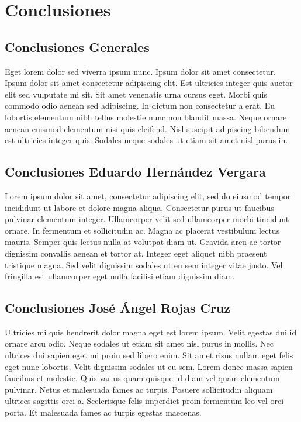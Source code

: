 \section{Conclusiones}
	\subsection{Conclusiones Generales}
	Eget lorem dolor sed viverra ipsum nunc. Ipsum dolor sit amet consectetur. Ipsum dolor sit amet consectetur adipiscing elit. Est ultricies integer quis auctor elit sed vulputate mi sit. Sit amet venenatis urna cursus eget. Morbi quis commodo odio aenean sed adipiscing. In dictum non consectetur a erat. Eu lobortis elementum nibh tellus molestie nunc non blandit massa. Neque ornare aenean euismod elementum nisi quis eleifend. Nisl suscipit adipiscing bibendum est ultricies integer quis. Sodales neque sodales ut etiam sit amet nisl purus in.
	\subsection{Conclusiones Eduardo Hern\'andez Vergara}
		Lorem ipsum dolor sit amet, consectetur adipiscing elit, sed do eiusmod tempor incididunt ut labore et dolore magna aliqua. Consectetur purus ut faucibus pulvinar elementum integer. Ullamcorper velit sed ullamcorper morbi tincidunt ornare. In fermentum et sollicitudin ac. Magna ac placerat vestibulum lectus mauris. Semper quis lectus nulla at volutpat diam ut. Gravida arcu ac tortor dignissim convallis aenean et tortor at. Integer eget aliquet nibh praesent tristique magna. Sed velit dignissim sodales ut eu sem integer vitae justo. Vel fringilla est ullamcorper eget nulla facilisi etiam dignissim diam.
	\subsection{Conclusiones Jos\'e \'Angel Rojas Cruz}
	Ultricies mi quis hendrerit dolor magna eget est lorem ipsum. Velit egestas dui id ornare arcu odio. Neque sodales ut etiam sit amet nisl purus in mollis. Nec ultrices dui sapien eget mi proin sed libero enim. Sit amet risus nullam eget felis eget nunc lobortis. Velit dignissim sodales ut eu sem. Lorem donec massa sapien faucibus et molestie. Quis varius quam quisque id diam vel quam elementum pulvinar. Netus et malesuada fames ac turpis. Posuere sollicitudin aliquam ultrices sagittis orci a. Scelerisque felis imperdiet proin fermentum leo vel orci porta. Et malesuada fames ac turpis egestas maecenas.

